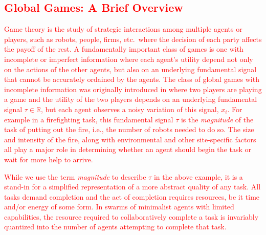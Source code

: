 \documentclass[smallextended]{svjour3}       %
\newcommand{\edit}[1]{\textcolor{red}{#1}}
\begin{document}
\edit{
\section{Global Games: A Brief Overview}\label{sec:ggoverview}
Game theory is the study of strategic interactions among multiple agents or players, such as robots, people, firms, etc.\ where the decision of each party affects the payoff of the rest. A fundamentally important class of games is one with incomplete or imperfect information where each agent's utility depend not only on the actions of the other agents, but also on an underlying fundamental signal that cannot be accurately ordained by the agents. The class of global games with incomplete information was originally introduced in \cite{Carlsson1993} where two players are playing a game and the utility of the two players depends on an underlying fundamental signal $\tau \in \mathbb{R}$, but each agent observes a noisy variation of this signal, $x_i$. For example in a firefighting task, this fundamental signal $\tau$ is the \emph{magnitude} of the task of putting out the fire, i.e., the number of robots needed to do so. The size and intensity of the fire, along with environmental and other site-specific factors all play a major role in determining whether an agent should begin the task or wait for more help to arrive.

While we use the term \emph{magnitude} to describe $\tau$ in the above example, it is a stand-in for a simplified representation of a more abstract quality of any task. All tasks demand completion and the act of completion requires resources, be it time and/or energy of some form. In swarms of minimalist agents with limited capabilities, the resource required to collaboratively complete a task is invariably quantized into the number of agents attempting to complete that task.
}
\end{document}

